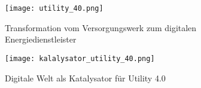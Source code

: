 \begin{figure}[h]
  \texttt{[image: utility\_40.png]}
  \caption[Transformation vom Versorgungswerk zum digitalen Energiedienstleister]{Transformation vom Versorgungswerk zum digitalen Energiedienstleister \citep[S. 13]{Doleski2016}}
\end{figure}

\begin{figure}[h]
  \texttt{[image: kalalysator\_utility\_40.png]}
  \caption[Digitale Welt als Katalysator für Utility 4.0 ]{Digitale Welt als Katalysator für Utility 4.0 \citep[S. 17]{Doleski2016}}
\end{figure}
